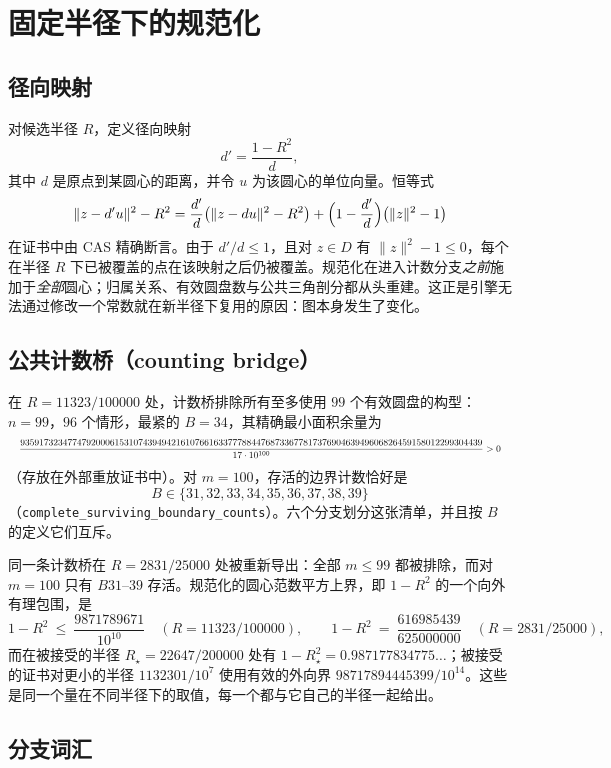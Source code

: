 \section{固定半径下的规范化}

\subsection{径向映射}

对候选半径 $R$，定义径向映射
\[
d'=\frac{1-R^2}{d},
\]
其中 $d$ 是原点到某圆心的距离，并令 $u$ 为该圆心的单位向量。恒等式
\begin{equation}\label{eq:radial-identity}
\|z-d'u\|^2-R^2=\frac{d'}{d}\bigl(\|z-du\|^2-R^2\bigr)+\Bigl(1-\frac{d'}{d}\Bigr)\bigl(\|z\|^2-1\bigr)
\end{equation}
在证书中由 CAS 精确断言。由于 $d'/d\le1$，且对 $z\in D$ 有 $\|z\|^2-1\le0$，每个在半径 $R$ 下已被覆盖的点在该映射之后仍被覆盖。规范化在进入计数分支\emph{之前}施加于\emph{全部}圆心；归属关系、有效圆盘数与公共三角剖分都从头重建。这正是引擎无法通过修改一个常数就在新半径下复用的原因：图本身发生了变化。

\subsection{公共计数桥（counting bridge）}

在 $R=11323/100000$ 处，计数桥排除所有至多使用 $99$ 个有效圆盘的构型：$n=99$，$96$ 个情形，最紧的 $B=34$，其精确最小面积余量为
\[
\resizebox{\textwidth}{!}{$\displaystyle \frac{93591732347747920006153107439494216107661633777884476873367781737690463949606826459158012299304439}{17\cdot10^{100}}>0$}
\]
（存放在外部重放证书中）。对 $m=100$，存活的边界计数恰好是
\[
B\in\{31,32,33,34,35,36,37,38,39\}
\]
（\texttt{complete\_\allowbreak{}surviving\_\allowbreak{}boundary\_\allowbreak{}counts}）。六个分支划分这张清单，并且按 $B$ 的定义它们互斥。

同一条计数桥在 $R=2831/25000$ 处被重新导出：全部 $m\le99$ 都被排除，而对 $m=100$ 只有 $B31$--$39$ 存活。规范化的圆心范数平方上界，即 $1-R^2$ 的一个向外有理包围，是
\[
1-R^2\ \le\ \frac{9871789671}{10^{10}}\quad(R=11323/100000),\qquad
1-R^2\ =\ \frac{616985439}{625000000}\quad(R=2831/25000),
\]
而在被接受的半径 $R_\star=22647/200000$ 处有 $1-R_\star^2=0.987177834775\ldots$；被接受的证书对更小的半径 $1132301/10^7$ 使用有效的外向界 $98717894445399/10^{14}$。这些是同一个量在不同半径下的取值，每一个都与它自己的半径一起给出。

\subsection{分支词汇}

